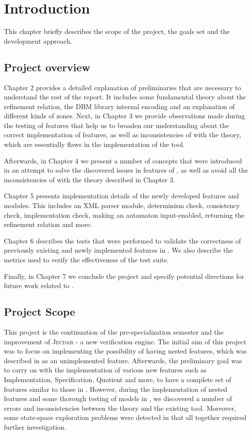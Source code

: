 \chapter{Introduction}\label{ch:intro}
This chapter briefly describes the scope of the project, the goals set and the development approach.

\section{Project overview}
Chapter 2 provides a detailed explanation of preliminaries that are necessary to understand the rest of the report. It includes some fundamental theory about the refinement relation, the DBM library internal encoding and an explanation of different kinds of zones. Next, in Chapter 3 we provide observations made during the testing of  features that help us to broaden our understanding about the correct implementation of features, as well as inconsistencies of  with the theory, which are essentially flaws in the implementation of the tool.

Afterwards, in Chapter 4 we present a number of concepts that were introduced in an attempt to solve the discovered issues in features of \jecdar, as well as avoid all the inconsistencies of  with the theory described in Chapter 3. 

Chapter 5 presents implementation details of the newly developed features and modules. This includes an XML parser module, determinism check, consistency check, implementation check, making an automaton input-enabled, returning the refinement relation and more.

Chapter 6 describes the tests that were performed to validate the correctness of previously existing and newly implemented features in \jecdar. We also describe the metrics used to verify the effectiveness of the test suite.

Finally, in Chapter 7 we conclude the project and specify potential directions for future work related to \jecdar.


\section{Project Scope}
This project is the continuation of the pre-specialization semester and the improvement of \textsc{Jecdar} - a new verification engine. The initial aim of this project was to focus on implementing the possibility of having nested features, which was described in \textcite{Jecdar:2019} as an unimplemented feature. Afterwards, the preliminary goal was to carry on with the implementation of various new features such as Implementation, Specification, Quotient and more, to have a complete set of features similar to those in . However, during the implementation of nested features and some thorough testing of models in , we discovered a number of errors and inconsistencies between the theory and the existing  tool. Moreover, some state-space exploration problems were detected in \jecdar that all together required further investigation.

